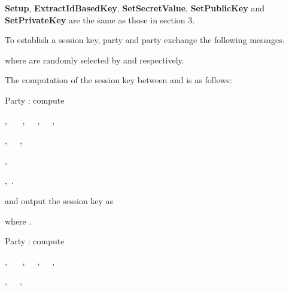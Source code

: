 \documentclass[final,1p,times,twocolumn]{elsarticle}
\begin{document}
{\bf Setup}, {\bf ExtractIdBasedKey}, {\bf SetSecretValue}, {\bf SetPublicKey} and {\bf SetPrivateKey} are the same as those in section 3.

 \vspace{0.1cm}

\noindent

 \vspace{0.1cm}

To establish a session key, party  and party  exchange the following messages.

\vspace{0.1cm}




\vspace{0.1cm}

where  are randomly selected by  and  respectively.

The computation of the session key between  and  is as follows:

Party : compute

\vspace{0.1cm}

, \ \ \ ,\ \ \ ,\ \ \ ,

\vspace{0.1cm}

,\ \ \  ,\ \ \ \

\vspace{0.1cm}

,

\vspace{0.1cm}

,\ .

and output the session key as

\vspace{0.1cm}



\vspace{0.1cm}

where .

\vspace{0.2cm}

Party : compute

\vspace{0.1cm}

, \ \ \ ,\ \ \ ,\ \ \ ,

\vspace{0.1cm}

,\ \ \  ,\ \ \ \

\vspace{0.1cm}



\vspace{0.1cm}
\end{document}
